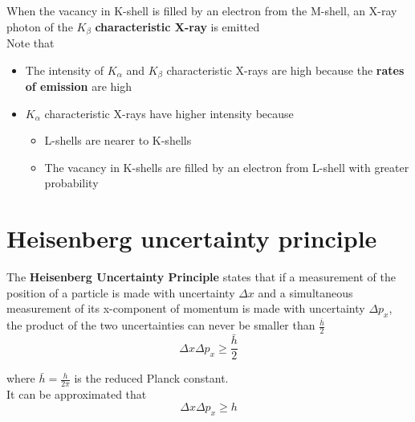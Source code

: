 \documentclass[a4paper, 10pt]{article}
\begin{document}
   When the vacancy in K-shell is filled by an electron from the M-shell, an X-ray photon of the $K_{\beta}$ \textbf{characteristic X-ray} is emitted \\
Note that
\begin{itemize}
   \item The intensity of $K_{\alpha}$ and $K_{\beta}$ characteristic X-rays are high because the \textbf{rates of emission} are high
   \item $K_{\alpha}$ characteristic X-rays have higher intensity because 
      \begin{itemize}
         \item L-shells are nearer to K-shells 
         \item The vacancy in K-shells are filled by an electron from L-shell  with greater probability
      \end{itemize}	
\end{itemize}	

\section{Heisenberg uncertainty principle}
\begin{framed}
   The \textbf{Heisenberg Uncertainty Principle} states that if a measurement of the position of a particle is made with uncertainty $\Delta x$  and a simultaneous measurement of its x-component of momentum is made with uncertainty $\Delta p_x$, the product of the two uncertainties can never be smaller than $\frac{\bar h}{2}$ 
   \[
   \Delta x \Delta p_x \ge \frac{\bar h}{2}
   \]

   where $\bar h = \frac{h}{2\pi}$ is the reduced Planck constant. \\

   It can be approximated that 
   \[
    \Delta x \Delta p_x \ge h
   \]
\end{framed}	
\end{document}
